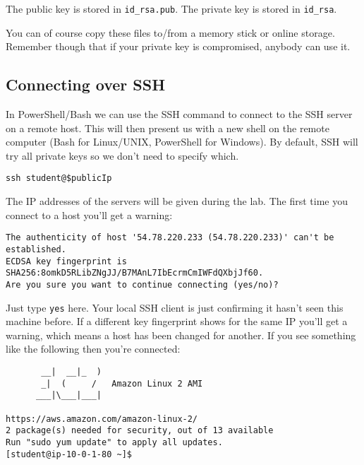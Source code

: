 The public key is stored in \texttt{id\_rsa.pub}.
The private key is stored in \texttt{id\_rsa}.

You can of course copy these files to/from a memory stick or online storage.
Remember though that if your private key is compromised,
anybody can use it.

\subsection{Connecting over SSH}
\label{connecting-over-ssh}

In PowerShell/Bash we can use the SSH command to connect to the SSH server on a remote host.
This will then present us with a new shell on the remote computer (Bash for Linux/UNIX, PowerShell for Windows).
By default, SSH will try all private keys so we don't need to specify which.

\begin{verbatim}
ssh student@$publicIp 
\end{verbatim}

The IP addresses of the servers will be given during the lab.
The first time you connect to a host you'll get a warning:

\begin{verbatim}
The authenticity of host '54.78.220.233 (54.78.220.233)' can't be established.
ECDSA key fingerprint is SHA256:8omkD5RLibZNgJJ/B7MAnL7IbEcrmCmIWFdQXbjJf60.
Are you sure you want to continue connecting (yes/no)?
\end{verbatim}

Just type \texttt{yes} here.
Your local SSH client is just confirming it hasn't seen this machine before.
If a different key fingerprint shows for the same IP you'll get a warning, which means a host has been changed for another.
If you see something like the following then you're connected:

\begin{verbatim}
       __|  __|_  )
       _|  (     /   Amazon Linux 2 AMI
      ___|\___|___|

https://aws.amazon.com/amazon-linux-2/
2 package(s) needed for security, out of 13 available
Run "sudo yum update" to apply all updates.
[student@ip-10-0-1-80 ~]$
\end{verbatim}



